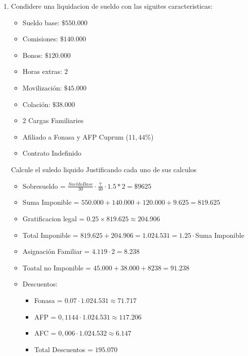 \documentclass[11pt]{article}
\begin{document}
\begin{enumerate}
    \item Condidere una liquidacion de sueldo con las siguites caracteristicas:
        \begin{itemize}
            \item Sueldo base: $\$550.000 $
            \item Comisiones: $\$140.000 $
            \item Bonos: $\$120.000 $
            \item Horas extras: $2$
            \item Movilización: $\$45.000 $
            \item Colación: $\$38.000 $
            \item 2 Cargas Familiaries
            \item Afiliado a Fonasa y AFP Cuprum ($11,44\%$)
            \item Contrato Indefinido
        \end{itemize}
        Calcule el suledo liquido Justificando cada uno de sus calculos \\
        \begin{itemize}
            \item Sobresueldo = $\frac{SueldoBase}{30} \cdot \frac{7}{40} \cdot 1.5 * 2 = \$9625$
            \item Suma Imponible = $550.000 + 140.000 + 120.000 + 9.625 = 819.625 $
            \item Gratificacion legal = $0.25 \times 819.625 \approx 204.906$
            \item Total Imponible = $819.625 + 204.906 = 1.024.531 = 1.25 \cdot$Suma Imponible
            \item Asignación Familiar = $4.119 \cdot 2 = 8.238$
            \item Toatal no Imponible = $45.000 + 38.000 + 8238 = 91.238$
            \item Descuentos:
            \begin{itemize}
                \item Fonasa = $0.07 \cdot 1.024.531 \approx 71.717 $
                \item AFP = $0,1144 \cdot 1.024.531 \approx 117.206 $
                \item AFC = $0,006 \cdot 1.024.532 \approx 6.147 $
                \item Total Descuentos = $195.070 $
            \end{itemize}


\end{itemize}
\end{enumerate}
\end{document}
